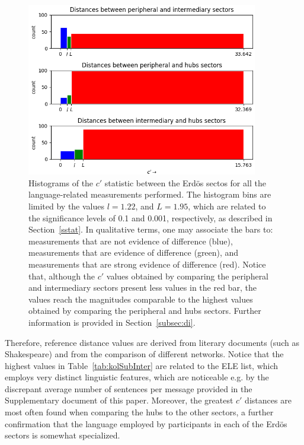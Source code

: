 \documentclass[review]{elsarticle}
\begin{document}
\begin{figure}[!h]
\centering
\includegraphics[width=0.9\textwidth]{figs/hists}
  \caption{Histograms of the $c'$ statistic between the Erd\"os sectos for all the language-related measurements performed. The histogram bins are limited by the values $l=1.22$, and $L=1.95$, which are related to the significance levels of 0.1 and 0.001, respectively, as described in Section~\ref{sstat}. 
  In qualitative terms, one may associate the bars to:
  measurements that are not evidence of difference (blue),
  measurements that are evidence of difference (green),
  and measurements that are strong evidence of difference (red).
  Notice that, although the $c'$ values obtained by comparing the peripheral and intermediary sectors present less values in the red bar, the values reach the magnitudes comparable to the highest values obtained by comparing the peripheral and hubs sectors.
  Further information is provided in Section~\ref{subsec:di}.}
\label{fdif}
\end{figure}

Therefore, reference distance values are derived from literary documents (such as Shakespeare) and from the comparison of different networks.
Notice that the highest values in Table~\ref{tab:kolSubInter} are related to the ELE list, which employs very distinct linguistic features, which are noticeable e.g. by the discrepant average number of sentences per message provided in the Supplementary document of this paper.
Moreover, the greatest $c'$ distances are most often found when comparing the hubs to the other sectors, a further confirmation that the language employed by participants in each of the Erd\"os sectors is somewhat specialized.
\end{document}
